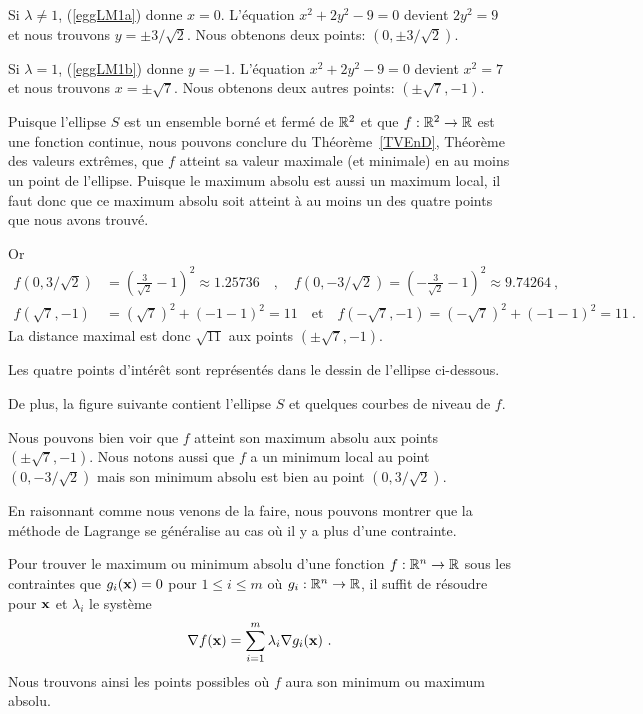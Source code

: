 {\begin{egg}
Si $\lambda \neq 1$, (\ref{eggLM1a}) donne $x = 0$.   L'équation
$x^2 + 2 y^2 - 9 = 0$ devient $2 y^2 = 9$ et nous trouvons
$y = \pm 3/\sqrt{2}$.   Nous obtenons deux points: $(0, \pm 3/\sqrt{2})$.

Si $\lambda = 1$, (\ref{eggLM1b}) donne $y = -1$.   L'équation
$x^2 + 2 y^2 - 9 = 0$ devient $x^2 = 7$ et nous trouvons
$x = \pm \sqrt{7}$.   Nous obtenons deux autres points: $(\pm \sqrt{7}, -1)$.

Puisque l'ellipse $S$ est un ensemble borné et fermé de $\mathbb{R}^2$ et que
$f:\mathbb{R}^2 \to \mathbb{R}$ est une fonction continue, nous pouvons conclure du
Théorème~\ref{TVEnD}, Théorème des valeurs extrêmes, que $f$ atteint
sa valeur maximale (et minimale) en au moins un point de l'ellipse.
Puisque le maximum absolu est aussi un maximum local, il faut donc que
ce maximum absolu soit atteint à au moins un des quatre points que
nous avons trouvé.

Or
\begin{align*}
f(0,3/\sqrt{2}) &= \left(\frac{3}{\sqrt{2}} - 1\right)^2 \approx 1.25736
\quad , \quad
f(0,-3/\sqrt{2}) = \left(-\frac{3}{\sqrt{2}} - 1\right)^2 \approx 9.74264
\ , \\
f(\sqrt{7},-1) &= (\sqrt{7})^2 + (-1-1)^2 = 11
\quad \text{et} \quad
f(-\sqrt{7},-1) = (-\sqrt{7})^2 + (-1-1)^2 = 11 \ .
\end{align*}
La distance maximal est donc $\sqrt{11}$ aux points $(\pm\sqrt{7}, -1)$.

Les quatre points d'intérêt sont représentés dans le dessin de
l'ellipse ci-dessous.

De plus, la figure suivante contient l'ellipse $S$ et quelques courbes
de niveau de $f$.

Nous pouvons bien voir que $f$ atteint son maximum absolu aux points
$(\pm\sqrt{7}, -1)$.  Nous notons aussi que $f$ a un minimum local au
point $(0,-3/\sqrt{2})$ mais son minimum absolu est bien au point
$(0,3/\sqrt{2})$.
\label{eggLM1}
\end{egg}

En raisonnant comme nous venons de la faire, nous pouvons montrer que la méthode
de Lagrange se généralise au cas où il y a plus d'une contrainte.

\begin{meth} 
Pour trouver le maximum ou minimum absolu d'une fonction
$f:\mathbb{R}^n \to \mathbb{R}$ sous les contraintes que $g_i(\mathbf{x}) = 0$ pour
$1\leq i \leq m$ où $g_i:\mathbb{R}^n \to \mathbb{R}$, il suffit de résoudre pour
$\mathbf{x}$ et $\lambda_i$ le système
\[
 \nabla f(\mathbf{x}) = \sum_{i=1}^m \lambda_i \nabla g_i(\mathbf{x}) \ .
\]
Nous trouvons ainsi les points possibles où $f$ aura son minimum ou
maximum absolu.
\end{meth}

}
